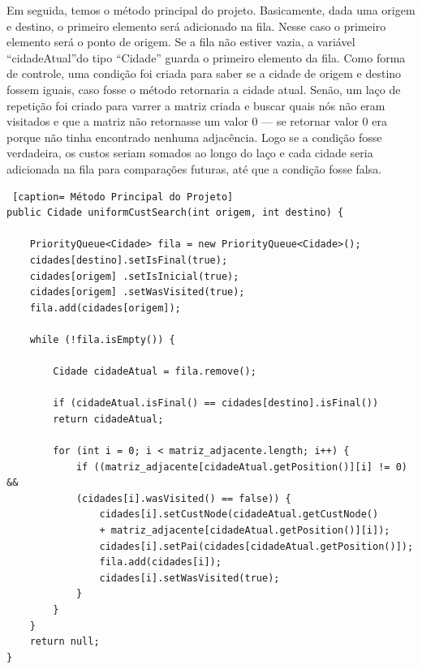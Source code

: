 \documentclass[12pt]{article}
\begin{document}
Em seguida, temos o método principal do projeto. Basicamente, dada uma origem e destino, o primeiro elemento será adicionado na fila. Nesse caso o primeiro elemento será o ponto de origem. Se a fila não estiver vazia, a variável ``cidadeAtual''do tipo ``Cidade'' guarda o primeiro elemento da fila. Como forma de controle, uma condição foi criada para saber se a cidade de origem e destino fossem iguais, caso fosse o método retornaria a cidade atual. Senão, um laço de repetição foi criado para varrer a matriz criada e buscar quais nós não eram visitados e que a matriz não retornasse um valor 0 --- se retornar valor 0 era porque não tinha encontrado nenhuma adjacência. Logo se a condição fosse verdadeira, os custos seriam somados ao longo do laço e cada cidade seria adicionada na fila para comparações futuras, até que a condição fosse falsa. 
\begin{lstlisting} [caption= Método Principal do Projeto]
public Cidade uniformCustSearch(int origem, int destino) {

	PriorityQueue<Cidade> fila = new PriorityQueue<Cidade>();
	cidades[destino].setIsFinal(true);
	cidades[origem] .setIsInicial(true);
	cidades[origem] .setWasVisited(true);
	fila.add(cidades[origem]);
	
	while (!fila.isEmpty()) {
	
		Cidade cidadeAtual = fila.remove();
		
		if (cidadeAtual.isFinal() == cidades[destino].isFinal())
		return cidadeAtual;
		
		for (int i = 0; i < matriz_adjacente.length; i++) {
			if ((matriz_adjacente[cidadeAtual.getPosition()][i] != 0) && 
			(cidades[i].wasVisited() == false)) {
				cidades[i].setCustNode(cidadeAtual.getCustNode()
				+ matriz_adjacente[cidadeAtual.getPosition()][i]);
				cidades[i].setPai(cidades[cidadeAtual.getPosition()]);
				fila.add(cidades[i]);
				cidades[i].setWasVisited(true);
			}
		}
	}
	return null;
}
\end{lstlisting}
\end{document}
